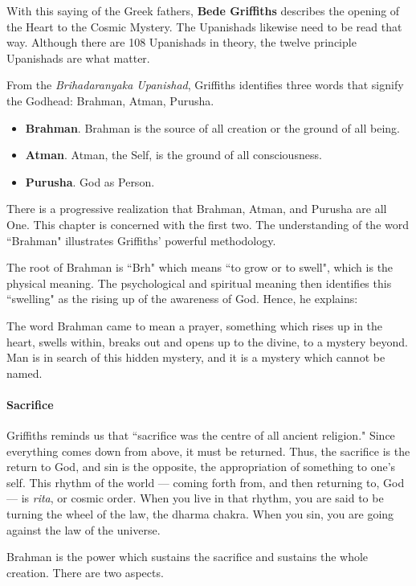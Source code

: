 With this saying of the Greek fathers, \textbf{Bede Griffiths} describes the opening of the Heart to the Cosmic Mystery. The Upanishads likewise need to be read that way. Although there are 108 Upanishads in theory, the twelve principle Upanishads are what matter.

From the \emph{Brihadaranyaka Upanishad}, Griffiths identifies three words that signify the Godhead: Brahman, Atman, Purusha.

\begin{itemize}
\item \textbf{Brahman}. Brahman is the source of all creation or the ground of all being. 
\item \textbf{Atman}. Atman, the Self, is the ground of all consciousness. 
\item \textbf{Purusha}. God as Person. 
\end{itemize}
There is a progressive realization that Brahman, Atman, and Purusha are all One. This chapter is concerned with the first two. The understanding of the word ``Brahman" illustrates Griffiths' powerful methodology.

The root of Brahman is ``Brh" which means ``to grow or to swell", which is the physical meaning. The psychological and spiritual meaning then identifies this ``swelling" as the rising up of the awareness of God. Hence, he explains:

\begin{quotex}
The word Brahman came to mean a prayer, something which rises up in the heart, swells within, breaks out and opens up to the divine, to a mystery beyond. Man is in search of this hidden mystery, and it is a mystery which cannot be named. 

\end{quotex}
\paragraph{Sacrifice}
Griffiths reminds us that ``sacrifice was the centre of all ancient religion." Since everything comes down from above, it must be returned. Thus, the sacrifice is the return to God, and sin is the opposite, the appropriation of something to one's self. This rhythm of the world — coming forth from, and then returning to, God — is \emph{rita}, or cosmic order. When you live in that rhythm, you are said to be turning the wheel of the law, the dharma chakra. When you sin, you are going against the law of the universe.

Brahman is the power which sustains the sacrifice and sustains the whole creation. There are two aspects.

